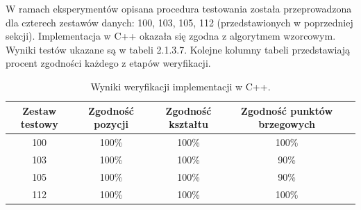 W ramach eksperymentów opisana procedura testowania została przeprowadzona dla czterech zestawów danych: 100, 103, 105, 112 (przedstawionych w poprzedniej sekcji). Implementacja w C++ okazała się zgodna z algorytmem wzorcowym. Wyniki testów ukazane są w tabeli 2.1.3.7. Kolejne kolumny tabeli przedstawiają procent zgodności każdego z etapów weryfikacji.
\begin{table}[H]
	\centering
	\caption{Wyniki weryfikacji implementacji w C++.}
	\label{tab:ST_weryfikacja}
	\begin{tabular}{|c|c|c|c|c|}
	\hline
	Zestaw testowy & Zgodność pozycji & Zgodność kształtu & Zgodność punktów brzegowych \\ \hline
	100 & 100\% & 100\% & 100\%	\\ \hline
	103 & 100\% & 100\% & 90\%	\\ \hline
	105 & 100\% & 100\% & 90\%	\\ \hline
	112 & 100\% & 100\% & 100\%	\\ \hline
	\end{tabular}
\end{table}


